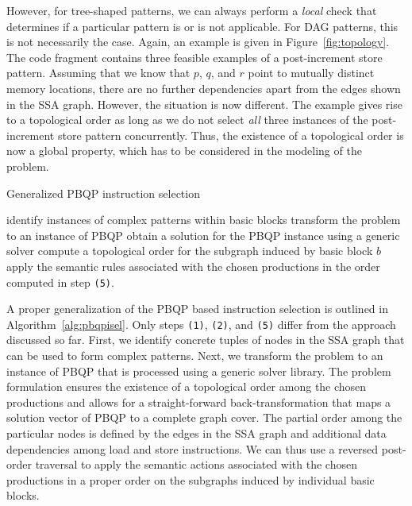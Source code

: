 However, for tree-shaped patterns, we can always perform a
\emph{local} check that determines if a particular pattern is or is
not applicable. For DAG patterns, this is not necessarily the
case. Again, an example is given in Figure~\ref{fig:topology}.  The
code fragment contains three feasible examples of a post-increment
store pattern. Assuming that we know that $p$, $q$, and $r$ point to
mutually distinct memory locations, there are no further dependencies
apart from the edges shown in the SSA graph.  However, the situation
is now different.  The example gives rise to a topological order as
long as we do not select \emph{all} three instances of the
post-increment store pattern concurrently. Thus, the existence of a
topological order is now a global property, which has to be considered
in the modeling of the problem.

\begin{algorithm}
\caption{Generalized PBQP instruction selection}
\label{alg:pbqpisel}
\begin{algorithmic}[1]
  \STATE identify instances of complex patterns within basic blocks
  \STATE transform the problem to an instance of PBQP
  \STATE obtain a solution for the PBQP instance using a generic
  solver
    \STATE compute a topological order for the subgraph
    induced by basic block $b$
    \STATE apply the semantic rules associated with the chosen
    productions in the order computed in step \texttt{(5)}.
  \ENDFOR
\end{algorithmic}
\end{algorithm}

A proper generalization of the PBQP based instruction selection
\cite{Ebner08} is outlined in Algorithm~\ref{alg:pbqpisel}. Only steps
\texttt{(1)}, \texttt{(2)}, and \texttt{(5)} differ from the approach
discussed so far. First, we identify concrete tuples of nodes in the
SSA graph that can be used to form complex patterns. Next, we
transform the problem to an instance of PBQP that is processed using a
generic solver library. The problem formulation ensures the existence
of a topological order among the chosen productions and allows for a
straight-forward back-transformation that maps a solution vector of
PBQP to a complete graph cover. The partial order among the particular
nodes is defined by the edges in the SSA graph and additional data
dependencies among load and store instructions.  We can thus use a
reversed post-order traversal to apply the semantic actions associated
with the chosen productions in a proper order on the subgraphs induced
by individual basic blocks.

